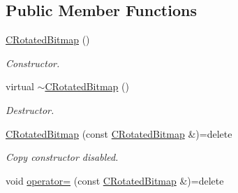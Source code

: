 \subsection*{Public Member Functions}
\begin{DoxyCompactItemize}
\item 
\hypertarget{class_c_rotated_bitmap_a365819034778a6afbb1b10d4901ace2f}{\hyperlink{class_c_rotated_bitmap_a365819034778a6afbb1b10d4901ace2f}{C\+Rotated\+Bitmap} ()}\label{class_c_rotated_bitmap_a365819034778a6afbb1b10d4901ace2f}

\begin{DoxyCompactList}\small\item\em Constructor. \end{DoxyCompactList}\item 
\hypertarget{class_c_rotated_bitmap_ac8e1965b53e52ed4e9f136922323a995}{virtual \hyperlink{class_c_rotated_bitmap_ac8e1965b53e52ed4e9f136922323a995}{$\sim$\+C\+Rotated\+Bitmap} ()}\label{class_c_rotated_bitmap_ac8e1965b53e52ed4e9f136922323a995}

\begin{DoxyCompactList}\small\item\em Destructor. \end{DoxyCompactList}\item 
\hypertarget{class_c_rotated_bitmap_a1d8ebcd9419be8f843424bbf358bf97b}{\hyperlink{class_c_rotated_bitmap_a1d8ebcd9419be8f843424bbf358bf97b}{C\+Rotated\+Bitmap} (const \hyperlink{class_c_rotated_bitmap}{C\+Rotated\+Bitmap} \&)=delete}\label{class_c_rotated_bitmap_a1d8ebcd9419be8f843424bbf358bf97b}

\begin{DoxyCompactList}\small\item\em Copy constructor disabled. \end{DoxyCompactList}\item 
\hypertarget{class_c_rotated_bitmap_acd754404ab66f7f2f8336eaa5d9391cb}{void \hyperlink{class_c_rotated_bitmap_acd754404ab66f7f2f8336eaa5d9391cb}{operator=} (const \hyperlink{class_c_rotated_bitmap}{C\+Rotated\+Bitmap} \&)=delete}\label{class_c_rotated_bitmap_acd754404ab66f7f2f8336eaa5d9391cb}


\end{DoxyCompactItemize}
